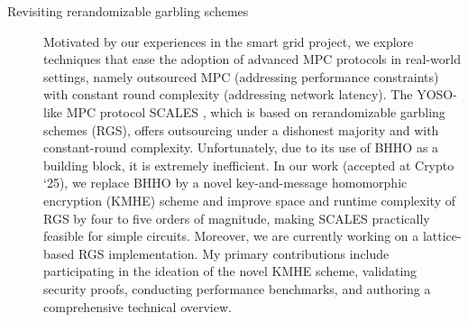 \documentclass{article}
\begin{document}
\begin{description}
    \item[Revisiting rerandomizable garbling schemes] Motivated by our experiences in the smart grid project, we explore techniques that ease the adoption of advanced MPC protocols in real-world settings, namely outsourced MPC (addressing performance constraints) with constant round complexity (addressing network latency). The YOSO-like MPC protocol SCALES \cite{AcharyaHKP22}, which is based on rerandomizable garbling schemes (RGS), offers outsourcing under a dishonest majority and with constant-round complexity. Unfortunately, due to its use of BHHO \cite{BonehHHO08} as a building block, it is extremely inefficient. In our work (accepted at Crypto ‘25), we replace BHHO by a novel key-and-message homomorphic encryption (KMHE) scheme and improve space and runtime complexity of RGS by four to five orders of magnitude, making SCALES practically feasible for simple circuits. Moreover, we are currently working on a lattice-based RGS implementation. My primary contributions include participating in the ideation of the novel KMHE scheme, validating security proofs, conducting performance benchmarks, and authoring a comprehensive technical overview.
\end{description}
\end{document}
